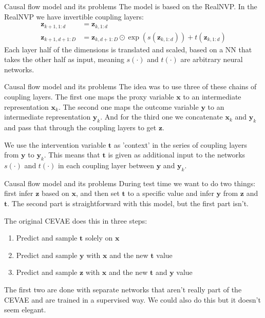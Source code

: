 \documentclass{beamer}
\newcommand{\bt}{\mathbf{t}}
\newcommand{\bx}{\mathbf{x}}
\newcommand{\by}{\mathbf{y}}
\newcommand{\bz}{\mathbf{z}}
\begin{document}
	\begin{frame}{Causal flow model and its problems}
	    The model is based on the RealNVP. In the RealNVP we have invertible coupling layers:
	    \begin{align}
	        \bz_{k+1, 1:d} &= \bz_{k, 1:d} \\
            \bz_{k+1, d+1:D} &= \bz_{k, d+1:D} \odot \exp \left(s(\bz_{k, 1:d}) \right) + t(\bz_{k, 1:d})
	    \end{align}
	    Each layer half of the dimensions is translated and scaled, based on a NN that takes the other half as input, meaning $s(\cdot)$ and $t(\cdot)$ are arbitrary neural networks.
	\end{frame}
	
	\begin{frame}{Causal flow model and its problems}
	    The idea was to use three of these chains of coupling layers. The first one maps the proxy variable $\bx$ to an intermediate representation $\bx_k$. The second one maps the outcome variable $\by$ to an intermediate representation $\by_k$. And for the third one we concatenate $\bx_k$ and $\by_k$ and pass that through the coupling layers to get $\bz$.
	    
	    We use the intervention variable $\bt$ as 'context' in the series of coupling layers from $\by$ to $\by_k$. This means that $\bt$ is given as additional input to the networks $s(\cdot)$ and $t(\cdot)$ in each coupling layer between $\by$ and $\by_k$.
	\end{frame}
	
	\begin{frame}{Causal flow model and its problems}
	     During test time we want to do two things: first infer $\bz$ based on $\bx$, and then set $\bt$ to a specific value and infer $\by$ from $\bz$ and $\bt$. The second part is straightforward with this model, but the first part isn't.
	     
	     The original CEVAE does this in three steps:
	     \begin{enumerate}
	         \item Predict and sample $\bt$ solely on $\bx$
	         \item Predict and sample $\by$ with $\bx$ and the new $\bt$ value
	         \item Predict and sample $\bz$ with $\bx$ and the new $\bt$ and $\by$ value
	     \end{enumerate}
	     The first two are done with separate networks that aren't really part of the CEVAE and are trained in a supervised way. We could also do this but it doesn't seem elegant. 
	\end{frame}
	
\end{document}
